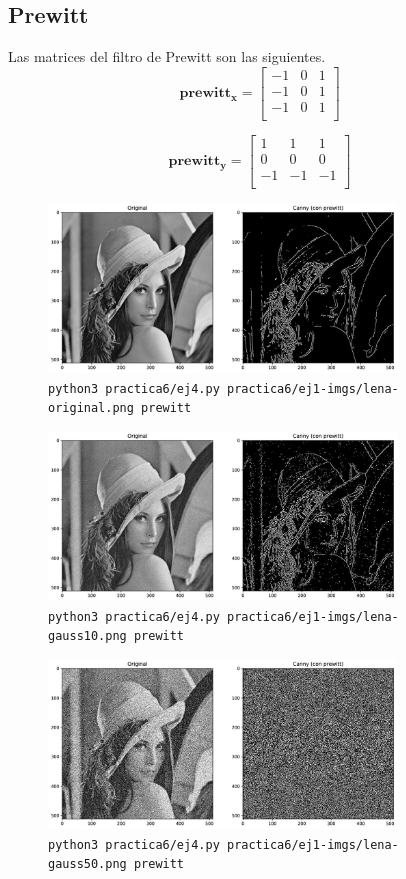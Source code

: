 \documentclass[11pt, spanish]{article}
\begin{document}
\newpage
\subsection{Prewitt}
Las matrices del filtro de Prewitt son las siguientes.
\[
\mathbf{prewitt_x} = \begin{bmatrix} 
-1 & 0 & 1 \\
-1 & 0 & 1 \\
-1 & 0 & 1 \\
\end{bmatrix}
\]

\[
\mathbf{prewitt_y} = \begin{bmatrix} 
1 & 1 & 1 \\
0 & 0 & 0 \\
-1 & -1 & -1 \\
\end{bmatrix}
\]

\begin{figure}[H]
\centering
    \includegraphics[height=4.5cm]{informe-imgs/ej4-prewitt-lena-original.jpg}
    \caption{\texttt{python3 practica6/ej4.py practica6/ej1-imgs/lena-original.png prewitt}}
\end{figure}

\begin{figure}[H]
\centering
    \includegraphics[height=4.5cm]{informe-imgs/ej4-prewitt-lena-gauss10.jpg}
    \caption{\texttt{python3 practica6/ej4.py practica6/ej1-imgs/lena-gauss10.png prewitt}}
\end{figure}

\begin{figure}[H]
\centering
    \includegraphics[height=4.5cm]{informe-imgs/ej4-prewitt-lena-gauss50.jpg}
    \caption{\texttt{python3 practica6/ej4.py practica6/ej1-imgs/lena-gauss50.png prewitt}}
\end{figure}
\end{document}
